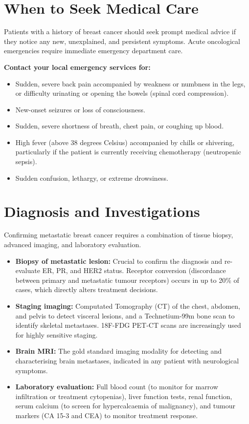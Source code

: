 \section*{When to Seek Medical Care}
Patients with a history of breast cancer should seek prompt medical advice if they notice any new, unexplained, and persistent symptoms. Acute oncological emergencies require immediate emergency department care.

\textbf{Contact your local emergency services for:}
\begin{itemize}
    \item Sudden, severe back pain accompanied by weakness or numbness in the legs, or difficulty urinating or opening the bowels (spinal cord compression).
    \item New-onset seizures or loss of consciousness.
    \item Sudden, severe shortness of breath, chest pain, or coughing up blood.
    \item High fever (above 38 degrees Celsius) accompanied by chills or shivering, particularly if the patient is currently receiving chemotherapy (neutropenic sepsis).
    \item Sudden confusion, lethargy, or extreme drowsiness.
\end{itemize}

\section*{Diagnosis and Investigations}
Confirming metastatic breast cancer requires a combination of tissue biopsy, advanced imaging, and laboratory evaluation.
\begin{itemize}
    \item \textbf{Biopsy of metastatic lesion:} Crucial to confirm the diagnosis and re-evaluate ER, PR, and HER2 status. Receptor conversion (discordance between primary and metastatic tumour receptors) occurs in up to 20\% of cases, which directly alters treatment decisions.
    \item \textbf{Staging imaging:} Computated Tomography (CT) of the chest, abdomen, and pelvis to detect visceral lesions, and a Technetium-99m bone scan to identify skeletal metastases. 18F-FDG PET-CT scans are increasingly used for highly sensitive staging.
    \item \textbf{Brain MRI:} The gold standard imaging modality for detecting and characterising brain metastases, indicated in any patient with neurological symptoms.
    \item \textbf{Laboratory evaluation:} Full blood count (to monitor for marrow infiltration or treatment cytopenias), liver function tests, renal function, serum calcium (to screen for hypercalcaemia of malignancy), and tumour markers (CA 15-3 and CEA) to monitor treatment response.
\end{itemize}

